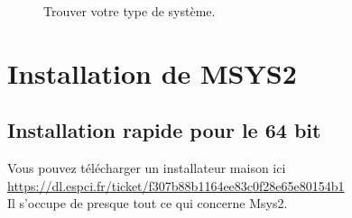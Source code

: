 \documentclass{article}
\begin{document}
\begin{figure}[H]
\begin{subfigure}[c]{0.5\textwidth}
\end{subfigure}
\caption{Trouver votre type de système.}
\end{figure}

\section{Installation de MSYS2}
\subsection{Installation rapide pour le 64 bit\label{S:FastInstall}}
Vous pouvez télécharger un installateur maison ici
\href{https://dl.espci.fr/ticket/f307b88b1164ee83c0f28e65e80154b1}{https://dl.espci.fr/ticket/f307b88b1164ee83c0f28e65e80154b1}\\
Il s'occupe de presque tout ce qui concerne Msys2.
\end{document}
